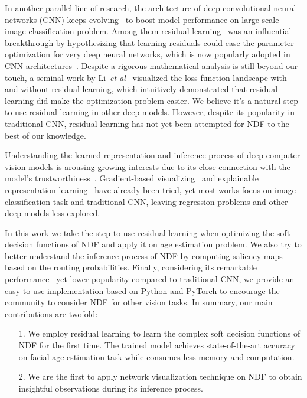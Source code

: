\documentclass{bmvc2k}
\def\etal{\emph{et al}\bmvaOneDot}
\begin{document}
In another parallel line of research, the architecture of deep convolutional neural networks (CNN) keeps evolving~\cite{VGG,resnet,densenet} to boost model performance on large-scale image classification problem. Among them residual learning~\cite{resnet} was an influential breakthrough by hypothesizing that learning residuals could ease the parameter optimization for very deep neural networks, which is now popularly adopted in CNN architectures~\cite{resdenoise, H_module}. Despite a rigorous mathematical analysis is still beyond our touch, a seminal work by Li~\etal~\cite{loss_ls} visualized the loss function landscape with and without residual learning, which intuitively demonstrated that residual learning did make the optimization problem easier. We believe it's a natural step to use residual learning in other deep models. However, despite its popularity in traditional CNN, residual learning has not yet been attempted for NDF to the best of our knowledge.

Understanding the learned representation and inference process of deep computer vision models is arousing growing interests due to its close connection with the model's trustworthiness~\cite{car}. Gradient-based visualizing~\cite{saliency, invert} and explainable representation learning~\cite{interpret, inter_tree} have already been tried, yet most works focus on image classification task and traditional CNN, leaving regression problems and other deep models less explored.  

In this work we take the step to use residual learning when optimizing the soft decision functions of NDF and apply it on age estimation problem. We also try to better understand the inference process of NDF by computing saliency maps based on the routing probabilities. Finally, considering its remarkable performance~\cite{NDF, DRFs} yet lower popularity compared to traditional CNN, we provide an easy-to-use implementation based on Python and PyTorch to encourage the community to consider NDF for other vision tasks. In summary, our main contributions are twofold: 

\begin{itemize}
	\item[1.] We employ residual learning to learn the complex soft decision functions of NDF for the first time. The trained model achieves state-of-the-art accuracy on facial age estimation task while consumes less memory and computation.
	\item[2.] We are the first to apply network visualization technique on NDF to obtain insightful observations during its inference process.	
\end{itemize}
\end{document}
